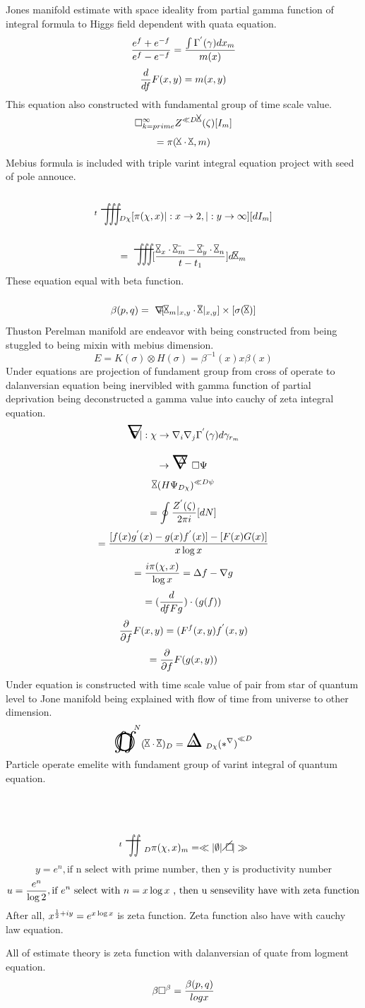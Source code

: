 \documentclass{jsarticle}
\begin{document}
  Jones manifold estimate with space ideality from partial gamma function
  of integral formula to Higgs field dependent with quata equation.
  $$ {{e^{f} + e^{-f}} \over {e^{f} - e^{-f}}} = {{\int \Gamma^{'}(\gamma)
  dx_m} \over {m(x)}} $$
  $$ {d \over {d f}}F(x,y) = m(x,y) $$
  This equation also constructed with fundamental group of time scale value.
  $$ \square_{k = prime}^{\infty} Z^{\ll D{\timebow}}(\zeta)[I_m] $$
  $$ = \pi(\timebow\cdot \bar{\timebow},m) $$
  Mebius formula is included with triple varint integral equation project 
  with seed of pole annouce.
  $$ {}^{t}\scalebox{1.0}[2]{\variiint}_{D\chi}[\pi(\chi,x) |: x \to
  2, |:y \to \infty][dI_m]$$
  $$ = \scalebox{1.0}[2]{\variiint}[{{{\timebow_{x}\cdot \bar{\timebow_m}}
  - {\bar{\timebow_y}\cdot \timebow_n}}\over {t - t_1}}]d\timebow_m $$
  These equation equal with beta function.
  $$ \beta(p,q) = \secproduct[\timebow_m|_{x,y} \cdot \bar{\timebow}|_{x,y}
  ]\times [\sigma(\timebow)] $$
  Thuston Perelman manifold are endeavor with being constructed from being
  stuggled to being mixin with mebius dimension.
  $$ E = K(\sigma) \otimes H(\sigma) = \beta^{-1}(x)x\beta(x) $$
  Under equations are projection of fundament group from cross of operate to
  dalanversian equation being inervibled with gamma function of partial
  deprivation being deconstructed a gamma value into cauchy of zeta integral
  equation.
  $$ \innabla |:\chi \to \nabla_{i}\nabla_{j}\Gamma^{'}(\gamma)d\gamma_{r_m} $$
  $$ \to \starnabla \square \Psi $$
  $$ \timebow(H\Psi_{D\chi})^{\ll D\psi} $$
  $$ = \oint {{Z^{'}(\zeta)} \over {2\pi i}}[dN] $$
  $$ ={{[f(x)g^{'}(x) - g(x)f^{'}(x)] - [F(x)G(x)]} \over {x \log x}} $$
  $$ = {{i\pi(\chi,x)} \over {\log x}} = \Delta f - \nabla g $$
  $$ = ({d \over {d f}Fg})\cdot (g(f)) $$
  $$ {\partial \over {\partial f}}F(x,y) = (F^{f}(x,y)f^{'}(x,y) $$
  $$ = {\partial \over {\partial f}}F(g(x,y)) $$ 
  Under equation is constructed with time scale value of pair from star of
  quantum level to Jone manifold being explained with flow of time from
  universe to other dimension.
  $$ \whitewithbodercircleiint^{N} (\timebow \cdot \bar{\timebow})_{D}
  = \inndelta_{D\chi}{(\ast^{\nabla})}^{\ll D}$$
  Particle operate emelite with fundament group of varint integral of
  quantum equation.
  $$ {}^{t}\scalebox{1.0}[2]{\variint}_{D} 
  \pi(\chi,x)_m = \ll |\emptyset | \alearletter| \gg $$

  $$ y = e^{n}, \text{if n select with prime number, then y is productivity 
  number} $$
  $$ u = {e^{n} \over {\log 2}}, \text{if $e^{n}$ select with $n = x \log x$ 
  , then u sensevility have with zeta function} $$
  After all, $ x^{{1 \over 2} + iy} = e^{x \log x} $ is zeta function.
  Zeta function also have with cauchy law equation.

  All of estimate theory is zeta function with dalanversian of quate from
  logment equation. 
  $$ \beta \square^{\beta} = {\beta(p,q) \over {log x}} $$
\end{document}

